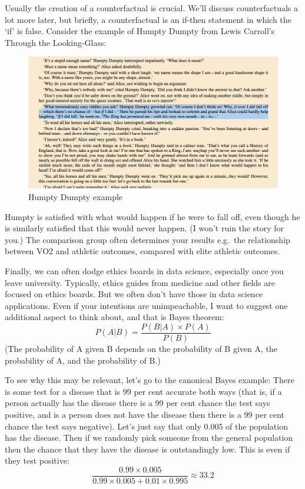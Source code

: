 \documentclass[
]{book}
\begin{document}
Usually the creation of a counterfactual is crucial. We'll discuss counterfactuals a lot more later, but briefly, a counterfactual is an if-then statement in which the `if' is false. Consider the example of Humpty Dumpty from Lewis Carroll's Through the Looking-Glass:

\begin{figure}
\includegraphics[width=0.9\linewidth]{figures/humpty} \caption{Humpty Dumpty example}\label{fig:humpty}
\end{figure}

Humpty is satisfied with what would happen if he were to fall off, even though he is similarly satisfied that this would never happen. (I won't ruin the story for you.) The comparison group often determines your results e.g.~the relationship between VO2 and athletic outcomes, compared with elite athletic outcomes.

Finally, we can often dodge ethics boards in data science, especially once you leave university. Typically, ethics guides from medicine and other fields are focused on ethics boards. But we often don't have those in data science applications. Even if your intentions are unimpeachable, I want to suggest one additional aspect to think about, and that is Bayes theorem:
\[P(A|B) = \frac{P(B|A)\times P(A)}{P(B)}\]
(The probability of A given B depends on the probability of B given A, the probability of A, and the probability of B.)

To see why this may be relevant, let's go to the canonical Bayes example: There is some test for a disease that is 99 per cent accurate both ways (that is, if a person actually has the disease there is a 99 per cent chance the test says positive, and is a person does not have the disease then there is a 99 per cent chance the test says negative). Let's just say that only 0.005 of the population has the disease. Then if we randomly pick someone from the general population then the chance that they have the disease is outstandingly low. This is even if they test positive:
\[\frac{0.99\times0.005}{0.99\times0.005 + 0.01\times0.995} \approx 33.2\]
\end{document}
